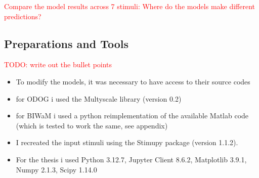 

\textcolor{red}{Compare the model results across 7 stimuli: Where
do the models make different predictions?}


\subsection{Preparations and Tools}
\textcolor{red}{TODO: write out the bullet points}
\begin{itemize}
    \item To modify the models, it was necessary to have access to their source codes
    \item for ODOG i used the Multyscale library (version 0.2)
    \item for BIWaM i used a python reimplementation of the available Matlab code (which
    is tested to work the same, see appendix)
    \item I recreated the input stimuli using the Stimupy package (version 1.1.2).
    \item For the thesis i used Python 3.12.7,  Jupyter Client 8.6.2, Matplotlib 3.9.1,
    Numpy 2.1.3, Scipy 1.14.0
\end{itemize}



